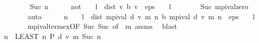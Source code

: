 \begin{isabellebody}
\ \ \isamarkupfalse%
\isanewline
\ \ \ \ \isamarkupfalse%
\ {\isacharparenleft}{\kern0pt}Suc\ n{\isacharparenright}{\kern0pt}\isanewline
\ \ \ \ \isamarkupfalse%
\ not{}{\isacharcolon}{\kern0pt}\ {\isachardoublequoteopen}{\isasymnot}\ {\isacharparenleft}{\kern0pt}{}\ {\isacharasterisk}{\kern0pt}\ l\ {\isacharasterisk}{\kern0pt}\ dist\ v\ {\isacharparenleft}{\kern0pt}{\isasymL}\isactrlsub b\ v{\isacharparenright}{\kern0pt}\ {\isacharless}{\kern0pt}\ eps\ {\isacharasterisk}{\kern0pt}\ {\isacharparenleft}{\kern0pt}{}\ {\isacharminus}{\kern0pt}\ l{\isacharparenright}{\kern0pt}{\isacharparenright}{\kern0pt}{\isachardoublequoteclose}\isanewline
\ \ \ \ \ \ \isamarkupfalse%
\ Suc{\isacharparenleft}{\kern0pt}{}{\isacharparenright}{\kern0pt}\ mpi{\isacharunderscore}{\kern0pt}val{\isacharunderscore}{\kern0pt}zero\isanewline
\ \ \ \ \ \ \isamarkupfalse%
\ auto\isanewline
\ \ \ \ \isamarkupfalse%
\ n{\isacharprime}{\kern0pt}\ \ {\isachardoublequoteopen}{}\ {\isacharasterisk}{\kern0pt}\ l\ {\isacharasterisk}{\kern0pt}\ dist\ {\isacharparenleft}{\kern0pt}mpi{\isacharunderscore}{\kern0pt}val\ d\ v\ m\ n{\isacharprime}{\kern0pt}{\isacharparenright}{\kern0pt}\ {\isacharparenleft}{\kern0pt}{\isasymL}\isactrlsub b\ {\isacharparenleft}{\kern0pt}mpi{\isacharunderscore}{\kern0pt}val\ d\ v\ m\ n{\isacharprime}{\kern0pt}{\isacharparenright}{\kern0pt}{\isacharparenright}{\kern0pt}\ {\isacharless}{\kern0pt}\ eps\ {\isacharasterisk}{\kern0pt}\ {\isacharparenleft}{\kern0pt}{}\ {\isacharminus}{\kern0pt}\ l{\isacharparenright}{\kern0pt}{\isachardoublequoteclose}\isanewline
\ \ \ \ \ \ \isamarkupfalse%
\ mpi{\isacharunderscore}{\kern0pt}val{\isacharunderscore}{\kern0pt}term{\isacharunderscore}{\kern0pt}ex{\isacharbrackleft}{\kern0pt}OF\ Suc{\isacharparenleft}{\kern0pt}{}{\isacharparenright}{\kern0pt}\ Suc{\isacharparenleft}{\kern0pt}{}{\isacharparenright}{\kern0pt}{\isacharcomma}{\kern0pt}\ of\ {\isacharunderscore}{\kern0pt}\ m{\isacharbrackright}{\kern0pt}\ assms\ \isamarkupfalse%
\ blast\isanewline
\ \ \ \ \isamarkupfalse%
\ {\isachardoublequoteopen}n\ {\isacharequal}{\kern0pt}\ {\isacharparenleft}{\kern0pt}LEAST\ n{\isachardot}{\kern0pt}\ {\isacharquery}{\kern0pt}P\ d\ v\ m\ {\isacharparenleft}{\kern0pt}Suc\ n{\isacharparenright}{\kern0pt}{\isacharparenright}{\kern0pt}{\isachardoublequoteclose}\isanewline
\ \ \ \ \ \ \isamarkupfalse%

\end{isabellebody}
